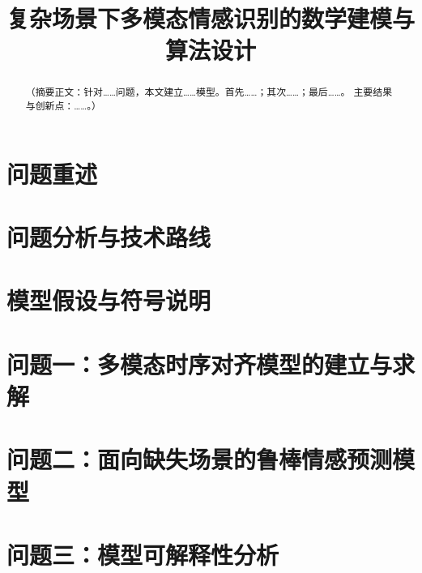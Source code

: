 \documentclass[colorprint]{gmcmthesis}
\title{复杂场景下多模态情感识别的数学建模与算法设计}
\begin{document}
\maketitle                    %

\begin{abstract}
（摘要正文：针对……问题，本文建立……模型。首先……；其次……；最后……。
主要结果与创新点：……。）

\end{abstract}

\maketoc

\section{问题重述}

\section{问题分析与技术路线}

\section{模型假设与符号说明}

\section{问题一：多模态时序对齐模型的建立与求解}

\section{问题二：面向缺失场景的鲁棒情感预测模型}

\section{问题三：模型可解释性分析}
\end{document}

